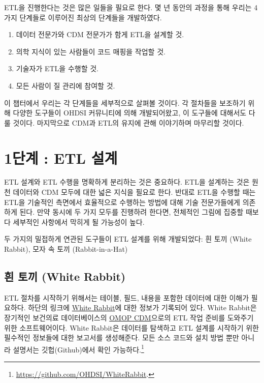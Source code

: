 \documentclass[11pt]{book}
\providecommand{\tightlist}{%
  \setlength{\itemsep}{0pt}\setlength{\parskip}{0pt}}
\let\rmarkdownfootnote\footnote%
\def\footnote{\protect\rmarkdownfootnote}
\theoremstyle{definition}
\theoremstyle{definition}
\theoremstyle{definition}
\theoremstyle{remark}
\begin{document}
ETL을 진행한다는 것은 많은 일들을 필요로 한다. 몇 년 동안의 과정을 통해
우리는 4가지 단계들로 이루어진 최상의 단계들을 개발하였다.

\begin{enumerate}
\def\labelenumi{\arabic{enumi}.}
\tightlist
\item
  데이터 전문가와 CDM 전문가가 함게 ETL을 설계할 것.
\item
  의학 지식이 있는 사람들이 코드 매핑을 작업할 것.
\item
  기술자가 ETL을 수행할 것.
\item
  모든 사람이 질 관리에 참여할 것.
\end{enumerate}

이 챕터에서 우리는 각 단계들을 세부적으로 살펴볼 것이다. 각 절차들을
보조하기 위해 다양한 도구들이 OHDSI 커뮤니티에 의해 개발되어왔고, 이
도구들에 대해서도 다룰 것이다. 마지막으로 CDM과 ETL의 유지에 관해
이야기하며 마무리할 것이다.

\section{1단계 : ETL 설계}\label{-etl-}

ETL 설계와 ETL 수행을 명확하게 분리하는 것은 중요하다. ETL을 설계하는
것은 원천 데이터와 CDM 모두에 대한 넓은 지식을 필요로 한다. 반대로 ETL을
수행할 때는 ETL을 기술적인 측면에서 효율적으로 수행하는 방법에 대해 기술
전문가들에게 의존하게 된다. 만약 동시에 두 가지 모두를 진행하려 한다면,
전체적인 그림에 집중할 때보다 세부적인 사항에서 막히게 될 가능성이 높다.

두 가지의 밀접하게 연관된 도구들이 ETL 설계를 위해 개발되었다: 흰 토끼
(White Rabbit), 모자 속 토끼 (Rabbit-in-a-Hat)

\subsection{흰 토끼 (White Rabbit)}\label{--white-rabbit}

ETL 절차를 시작하기 위해서는 테이블, 필드, 내용을 포함한 데이터에 대한
이해가 필요하다. 하단의 링크에
\href{https://github.com/OHDSI/WhiteRabbit}{White Rabbit}에 대한 정보가
기록되어 있다. White Rabbit은 장기적인 보건의료 데이터베이스의
\href{https://github.com/OHDSI/CommonDataModel}{OMOP CDM}으로의 ETL 작업
준비를 도와주기 위한 소프트웨어이다. White Rabbit은 데이터를 탐색하고
ETL 설계를 시작하기 위한 필수적인 정보들에 대한 보고서를 생성해준다.
모든 소스 코드와 설치 방법 뿐만 아니라 설명서는 깃헙(Github)에서 확인
가능하다.\footnote{\url{https://github.com/OHDSI/WhiteRabbit}.}
 
\end{document}
